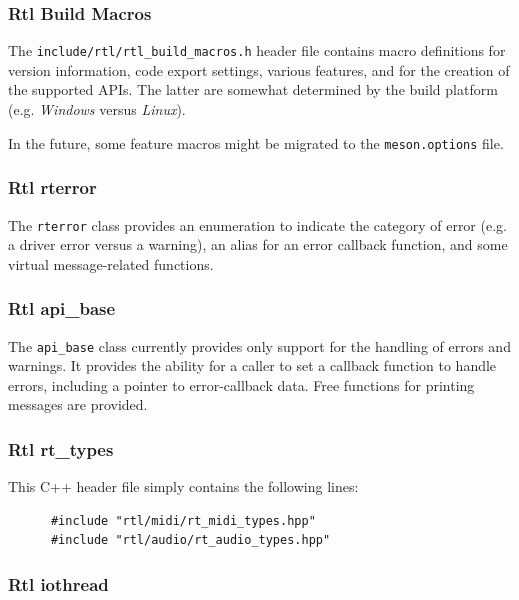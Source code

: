 \subsubsection{Rtl Build Macros}
\label{subsubsec:rtl_build_macros}

   The \texttt{include/rtl/rtl\_build\_macros.h}
   header file contains macro
   definitions for version information, code export settings,
   various features, and for the creation of the supported APIs.
   The latter are somewhat determined by the build platform (e.g.
   \textsl{Windows} versus \textsl{Linux}).

   In the future, some feature macros might be migrated to the
   \texttt{meson.options} file.

\subsubsection{Rtl rterror}
\label{subsubsec:rtl_rterror}

   The \texttt{rterror} class provides an enumeration to indicate the
   category of error (e.g. a driver error versus a warning),
   an alias for an error callback function, and some virtual message-related
   functions.

\subsubsection{Rtl api\_base}
\label{subsubsec:rtl_api_base}

   The \texttt{api\_base} class currently provides only support for
   the handling of errors and warnings.
   It provides the ability for a caller to set a callback function to
   handle errors, including a pointer to error-callback data.
   Free functions for printing messages are provided.

\subsubsection{Rtl rt\_types}
\label{subsubsec:rtl_rt_types}

   This C++ header file simply contains the following lines:

   \begin{verbatim}
      #include "rtl/midi/rt_midi_types.hpp"
      #include "rtl/audio/rt_audio_types.hpp"
   \end{verbatim}

\subsubsection{Rtl iothread}
\label{subsubsec:rtl_iothread}

